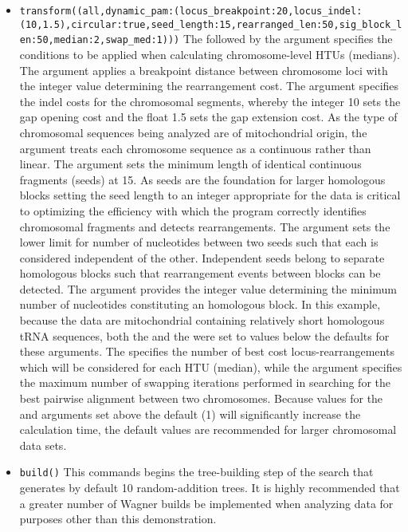\begin{itemize}
\item \texttt{transform((all,dynamic\_pam:(locus\_breakpoint:20,locus\_indel:\\(10,1.5),circular:true,seed\_length:15,rearranged\_len:50,sig\_block\_len:50,median:2,swap\_med:1)))}  The  followed by the argument  specifies the conditions to be applied when calculating chromosome-level HTUs (medians).  The argument  applies a breakpoint distance between chromosome loci with the integer value determining the rearrangement cost. The argument  specifies the indel costs for the chromosomal segments, whereby the integer 10 sets the gap opening cost and the float 1.5 sets the gap extension cost.  As the type of chromosomal sequences being analyzed are of mitochondrial origin, the argument  treats each chromosome sequence as a continuous rather than linear. The argument  sets the minimum length of identical continuous fragments (seeds) at 15.  As seeds are the foundation for larger homologous blocks setting the seed length to an integer appropriate for the data is critical to optimizing the efficiency with which the program correctly identifies chromosomal fragments and detects rearrangements.  The  argument sets the lower limit for number of nucleotides between two seeds such that each is considered independent of the other.  Independent seeds belong to separate homologous blocks such that rearrangement events between blocks can be detected.  The argument  provides the integer value determining the minimum number of nucleotides constituting an homologous block.  In this example, because the data are mitochondrial containing relatively short homologous tRNA sequences, both the  and the  were set to values below the defaults for these arguments.  The  specifies the number of best cost locus-rearrangements which will be considered for each HTU (median), while the  argument specifies the maximum number of swapping iterations performed in searching for the best pairwise alignment between two chromosomes.  Because values for the  and  arguments set above the default (1) will significantly increase the calculation time, the default values are recommended for larger chromosomal data sets.
\item \texttt{build()} This commands begins the tree-building step of the search that generates by default 10 random-addition trees. It is highly recommended that a greater number of Wagner builds be implemented when analyzing data for purposes other than this demonstration.

\end{itemize}
